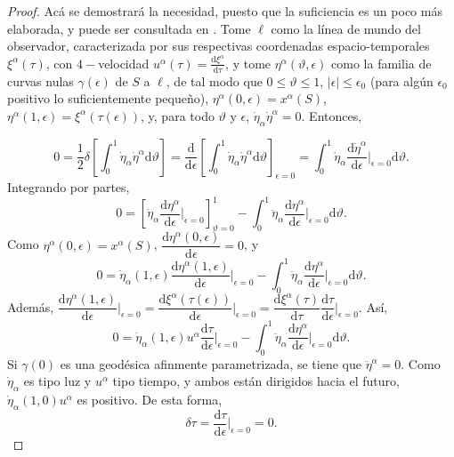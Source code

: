 \begin{proof}
Acá se demostrará la necesidad, puesto que la suficiencia es un poco más elaborada, y puede ser consultada en \cite{schneider_ehlers_falco_1992}. Tome $\ell$ como la línea de mundo del observador, caracterizada por sus respectivas coordenadas espacio-temporales $\xi^\alpha(\tau)$, con $4-$velocidad $u^\alpha(\tau)=\frac{\mathrm{d}\xi^\alpha}{\mathrm{d}\tau}$, y tome $\eta^\alpha(\vartheta,\epsilon)$ como la familia de curvas nulas $\gamma(\epsilon)$ de $S$ a $\ell$, de tal modo que $0\leq\vartheta\leq1$, $|\epsilon|\leq \epsilon_0$ (para algún $\epsilon_0$ positivo lo suficientemente pequeño), $\eta^\alpha(0,\epsilon)=x^\alpha(S)$, $\eta^\alpha(1,\epsilon)=\xi^\alpha(\tau(\epsilon))$, y, para todo $\vartheta$ y $\epsilon$, $\dot{\eta}_\alpha\dot{\eta}^\alpha=0$. Entonces,

$$0=\frac{1}{2}\delta\left[ \int_0^1 \dot{\eta}_\alpha\dot{\eta}^\alpha \mathrm{d}\vartheta  \right]=\frac{\mathrm{d}}{\mathrm{d}\epsilon}\left[ \int_0^1 \dot{\eta}_\alpha\dot{\eta}^\alpha \mathrm{d}\vartheta  \right]_{\epsilon=0}=\int_0^1 \dot{\eta}_\alpha \frac{\mathrm{d}\dot{\eta}^\alpha}{\mathrm{d}\epsilon}\Big|_{\epsilon=0}\mathrm{d}\vartheta.$$
Integrando por partes,
$$0=\left[ \dot{\eta}_\alpha\frac{\mathrm{d}\eta^\alpha}{\mathrm{d}\epsilon}\Big|_{\epsilon=0} \right]_{\vartheta=0}^1 -\int_0^1\ddot{\eta}_\alpha \frac{\mathrm{d}\eta^\alpha}{\mathrm{d}\epsilon}\Big|_{\epsilon=0}\mathrm{d}\vartheta.$$
Como $\eta^\alpha(0,\epsilon)=x^\alpha(S)$, $\dfrac{\mathrm{d}\eta^\alpha(0,\epsilon)}{\mathrm{d}\epsilon}=0$, y
$$0=\dot{\eta}_\alpha(1,\epsilon)\frac{\mathrm{d}\eta^\alpha(1,\epsilon)}{\mathrm{d}\epsilon}\Big|_{\epsilon=0}-\int_0^1\ddot{\eta}_\alpha\frac{\mathrm{d}\eta^\alpha}{\mathrm{d}\epsilon}\Big|_{\epsilon=0}\mathrm{d}\vartheta.$$
Además, $\dfrac{\mathrm{d}\eta^\alpha(1,\epsilon)}{\mathrm{d}\epsilon}\Big|_{\epsilon=0}=\dfrac{\mathrm{d}\xi^\alpha(\tau(\epsilon))}{\mathrm{d}\epsilon}\Big|_{\epsilon=0}=\dfrac{\mathrm{d}\xi^\alpha(\tau)}{\mathrm{d}\tau}\dfrac{\mathrm{d}\tau}{\mathrm{d}\epsilon}\Big|_{\epsilon=0}.$ Así,
$$0=\dot{\eta}_\alpha(1,\epsilon) u^\alpha\frac{\mathrm{d}\tau}{\mathrm{d}\epsilon}\Big|_{\epsilon=0}-\int_0^1\ddot{\eta}_\alpha\frac{\mathrm{d}\eta^\alpha}{\mathrm{d}\epsilon}\Big|_{\epsilon=0}\mathrm{d}\vartheta.$$
Si $\gamma(0)$ es una geodésica afinmente parametrizada, se tiene que $\ddot{\eta}^\alpha=0$. Como $\dot{\eta}_\alpha$ es tipo luz y $u^\alpha$ tipo tiempo, y ambos están dirigidos hacia el futuro, $\dot{\eta}_\alpha(1,0)u^\alpha$ es positivo. De esta forma,
$$\delta\tau=\frac{\mathrm{d}\tau}{\mathrm{d}\epsilon}\Big|_{\epsilon=0}=0.$$
\end{proof}